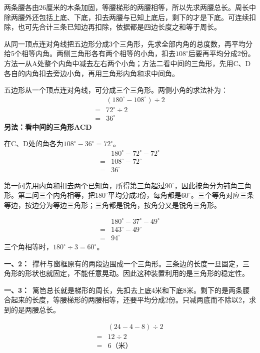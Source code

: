 \documentclass[multi=snippet,border=0pt]{standalone}
\newenvironment{snippet}[3]{\begin{minipage}{#1bp}\color{answerred}\fontsize{#2}{#3}\selectfont\raggedright}{\end{minipage}}
\begin{document}
\begin{snippet}{505}{11.5}{14}两条腰各由26厘米的木条加固，等腰梯形的两腰相等，所以先求两腰总长。周长中除两腰外还包括上底、下底，扣去两腰与已知上底后，剩下的才是下底。可连续扣除，也可先合计三条已知边再扣除，依据都是四边长度之和等于周长。\end{snippet}
\begin{snippet}{505}{11.5}{14}从同一顶点连对角线把五边形分成3个三角形，先求全部内角的总度数，再平均分给5个相等内角。两侧三角形各有两个相等的小角，扣去\(108^\circ\)后要再平均分成2份。方法一从A处整个内角中减去左右两个小角；方法二看中间的三角形，先用C、D各自的内角扣去旁边小角，再用三角形内角和求中间角。\par 五边形从一个顶点连对角线，可分成三个三角形。两侧小角的求法补为：\[\begin{aligned}&(180^\circ-108^\circ)\div2\\={}&72^\circ\div2\\={}&36^\circ\end{aligned}\]\textbf{另法：看中间的三角形ACD}\par 在C、D处的角各为\(108^\circ-36^\circ=72^\circ\)。\[\begin{aligned}&180^\circ-72^\circ-72^\circ\\={}&108^\circ-72^\circ\\={}&36^\circ\end{aligned}\]\end{snippet}
\begin{snippet}{505}{11.5}{14}第一问先用内角和扣去两个已知角，所得第三角超过\(90^\circ\)，因此按角分为钝角三角形。第二问三个内角相等，把\(180^\circ\)平均分成3份，每角都是\(60^\circ\)。三个等角对应三条等边，按边分为等边三角形；三角都是锐角，按角分又是锐角三角形。\par \[\begin{aligned}&180^\circ-37^\circ-49^\circ\\={}&143^\circ-49^\circ\\={}&94^\circ\end{aligned}\]三个角相等时，\(180^\circ\div3=60^\circ\)。\end{snippet}
\begin{snippet}{505}{11.5}{14}\textbf{一、2：}\ 撑杆与窗框原有的两段边围成一个三角形。三条边的长度一旦固定，三角形的形状也就固定，不能任意晃动。因此这种装置利用的是三角形的稳定性。\end{snippet}
\begin{snippet}{505}{11.5}{14}\textbf{一、3：}\ 篱笆总长就是梯形的周长，先扣去上底4米和下底8米。剩下的是两条腰合起来的长度，等腰梯形的两腰相等，还要平均分成2份。只减两底而不除以2，求到的是两腰总长。\par \[\begin{aligned}&(24-4-8)\div2\\={}&12\div2\\={}&6\text{（米）}\end{aligned}\]\end{snippet}
\end{document}
